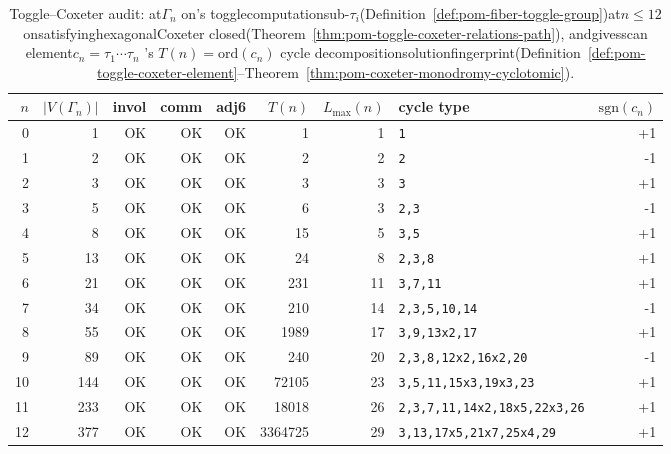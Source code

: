\begin{table}[H]
\centering
\scriptsize
\setlength{\tabcolsep}{5pt}
\caption{Toggle--Coxeter audit: at$\Gamma_n$ on's togglecomputationsub-$\tau_i$(Definition~\ref{def:pom-fiber-toggle-group})at$n\le 12$ onsatisfyinghexagonalCoxeter closed(Theorem~\ref{thm:pom-toggle-coxeter-relations-path}), andgivesscan element$c_n=\tau_1\cdots\tau_n$ 's $T(n)=\mathrm{ord}(c_n)$ cycle decompositionsolutionfingerprint(Definition~\ref{def:pom-toggle-coxeter-element}--Theorem~\ref{thm:pom-coxeter-monodromy-cyclotomic}). }
\label{tab:fibonacci_cube_toggle_coxeter_audit}
\begin{tabular}{r r r r r r r l r}
\toprule
$n$ & $|V(\Gamma_n)|$ & invol & comm & adj6 & $T(n)$ & $L_{\max}(n)$ & cycle type & $\mathrm{sgn}(c_n)$\\
\midrule
0 & 1 & OK & OK & OK & 1 & 1 & \texttt{1} & +1\\
1 & 2 & OK & OK & OK & 2 & 2 & \texttt{2} & -1\\
2 & 3 & OK & OK & OK & 3 & 3 & \texttt{3} & +1\\
3 & 5 & OK & OK & OK & 6 & 3 & \texttt{2,3} & -1\\
4 & 8 & OK & OK & OK & 15 & 5 & \texttt{3,5} & +1\\
5 & 13 & OK & OK & OK & 24 & 8 & \texttt{2,3,8} & +1\\
6 & 21 & OK & OK & OK & 231 & 11 & \texttt{3,7,11} & +1\\
7 & 34 & OK & OK & OK & 210 & 14 & \texttt{2,3,5,10,14} & -1\\
8 & 55 & OK & OK & OK & 1989 & 17 & \texttt{3,9,13x2,17} & +1\\
9 & 89 & OK & OK & OK & 240 & 20 & \texttt{2,3,8,12x2,16x2,20} & -1\\
10 & 144 & OK & OK & OK & 72105 & 23 & \texttt{3,5,11,15x3,19x3,23} & +1\\
11 & 233 & OK & OK & OK & 18018 & 26 & \texttt{2,3,7,11,14x2,18x5,22x3,26} & +1\\
12 & 377 & OK & OK & OK & 3364725 & 29 & \texttt{3,13,17x5,21x7,25x4,29} & +1\\
\bottomrule
\end{tabular}
\end{table}
